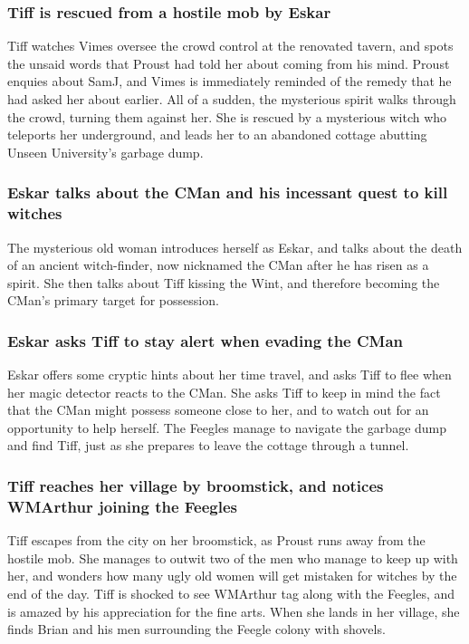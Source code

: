 \subsubsection{\Gls{Tiff} is rescued from a hostile mob by \Gls{Eskar}}
\Gls{Tiff} watches \Gls{Vimes} oversee the crowd control at the renovated tavern, and spots the
unsaid words that \Gls{Proust} had told her about coming from his mind. \Gls{Proust} enquies about
\Gls{SamJ}, and \Gls{Vimes} is immediately reminded of the remedy that he had asked her about
earlier. All of a sudden, the mysterious spirit walks through the crowd, turning them against her.
She is rescued by a mysterious witch who teleports her underground, and leads her to an abandoned
cottage abutting Unseen University's garbage dump.

\subsubsection{\Gls{Eskar} talks about the \Gls{CMan} and his incessant quest to kill witches}
The mysterious old woman introduces herself as \Gls{Eskar}, and talks about the death of an ancient
witch-finder, now nicknamed the \Gls{CMan} after he has risen as a spirit. She then talks about
\Gls{Tiff} kissing the \Gls{Wint}, and therefore becoming the \Gls{CMan}'s primary target for
possession.

\subsubsection{\Gls{Eskar} asks \Gls{Tiff} to stay alert when evading the \Gls{CMan}}
\Gls{Eskar} offers some cryptic hints about her time travel, and asks \Gls{Tiff} to flee when her
magic detector reacts to the \Gls{CMan}. She asks \Gls{Tiff} to keep in mind the fact that the
\Gls{CMan} might possess someone close to her, and to watch out for an opportunity to help herself.
The Feegles manage to navigate the garbage dump and find \Gls{Tiff}, just as she prepares to leave
the cottage through a tunnel.

\subsubsection{\Gls{Tiff} reaches her village by broomstick, and notices \Gls{WMArthur} joining
    the Feegles}
\Gls{Tiff} escapes from the city on her broomstick, as \Gls{Proust} runs away from the hostile mob.
She manages to outwit two of the men who manage to keep up with her, and wonders how many ugly
old women will get mistaken for witches by the end of the day. \Gls{Tiff} is shocked to see
\Gls{WMArthur} tag along with the Feegles, and is amazed by his appreciation for the fine arts.
When she lands in her village, she finds \Gls{Brian} and his men surrounding the Feegle colony with
shovels.

